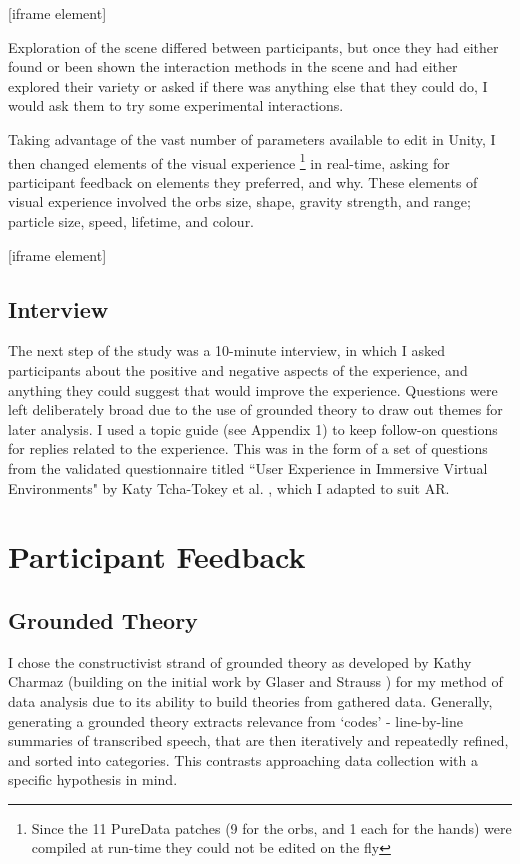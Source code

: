 [iframe element]

Exploration of the scene differed between participants, but once they had either found or been shown the interaction methods in the scene and had either explored their variety or asked if there was anything else that they could do, I would ask them to try some experimental interactions.

Taking advantage of the vast number of parameters available to edit in Unity, I then changed elements of the visual   experience \footnote{Since the 11 PureData patches (9 for the orbs, and 1 each for the hands) were compiled at run-time they could not be edited on the fly} in real-time, asking for participant feedback on elements they preferred, and why. These elements of visual experience involved the orbs size, shape, gravity strength, and range; particle size, speed, lifetime, and colour.

[iframe element]

\subsection{Interview}\label{sec: polaris-study-interview}
The next step of the study was a 10-minute interview, in which I asked participants about the positive and negative aspects of the experience, and anything they could suggest that would improve the experience. Questions were left deliberately broad due to the use of grounded theory to draw out themes for later analysis. I used a topic guide (see Appendix 1) to keep follow-on questions for replies related to the experience. This was in the form of a set of questions from the validated questionnaire titled ``User Experience in Immersive Virtual Environments" by Katy Tcha-Tokey et al. \citeyearpar{tcha-tokey2016a}, which I adapted to suit AR.

\section{Participant Feedback}\label{sec: polaris-feedback}
\subsection{Grounded Theory}\label{sec: polaris-feedback-grounded}
I chose the constructivist strand of grounded theory as developed by Kathy Charmaz \citeyearpar{charmaz2006} (building on the initial work by Glaser and Strauss \citeyearpar{glaser1967}) for my method of data analysis due to its ability to build theories from gathered data. Generally, generating a grounded theory extracts relevance from ‘codes’ - line-by-line summaries of transcribed speech, that are then iteratively and repeatedly refined, and sorted into categories. This contrasts approaching data collection with a specific hypothesis in mind.

